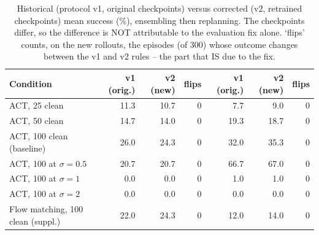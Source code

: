 \begin{table}[t]
\centering
\scriptsize
%
\begin{tabular}{lrrrrrr}
\toprule
Condition & v1 (orig.) & v2 (new) & flips & v1 (orig.) & v2 (new) & flips \\
\midrule
ACT, 25 clean & 11.3 & 10.7 & 0 & 7.7 & 9.0 & 0 \\
ACT, 50 clean & 14.7 & 14.0 & 0 & 19.3 & 18.7 & 0 \\
ACT, 100 clean (baseline) & 26.0 & 24.3 & 0 & 32.0 & 35.3 & 0 \\
ACT, 100 at $\sigma{=}0.5$ & 20.7 & 20.7 & 0 & 66.7 & 67.0 & 0 \\
ACT, 100 at $\sigma{=}1$ & 0.0 & 0.0 & 0 & 1.0 & 1.0 & 0 \\
ACT, 100 at $\sigma{=}2$ & 0.0 & 0.0 & 0 & 0.0 & 0.0 & 0 \\
Flow matching, 100 clean (suppl.) & 22.0 & 24.3 & 0 & 12.0 & 14.0 & 0 \\
\bottomrule
\end{tabular}
%
\caption{Historical (protocol v1, original checkpoints) versus corrected (v2, retrained checkpoints) mean success (\%), ensembling then replanning. The checkpoints differ, so the difference is NOT attributable to the evaluation fix alone. `flips' counts, on the new rollouts, the episodes (of 300) whose outcome changes between the v1 and v2 rules -- the part that IS due to the fix.}
\label{tab:oldnew}
\end{table}
